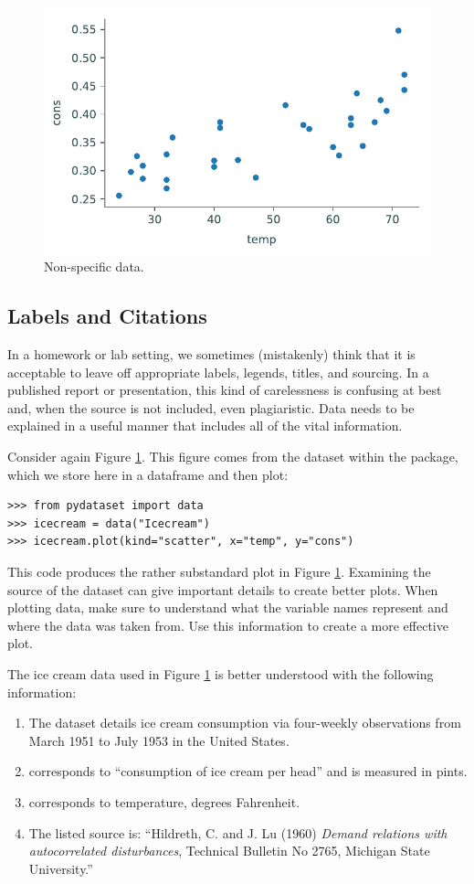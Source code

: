 \begin{figure}[H]
    \centering
    \includegraphics[width=.7\textwidth]{figures/ice_cream_bad.pdf}
    \caption{Non-specific data.}
    \label{fig:nolabels}
\end{figure}

\subsection*{Labels and Citations} %

In a homework or lab setting, we sometimes (mistakenly) think that it is acceptable to leave off appropriate labels, legends, titles, and sourcing.
In a published report or presentation, this kind of carelessness is confusing at best and, when the source is not included, even plagiaristic.
Data needs to be explained in a useful manner that includes all of the vital information.

Consider again Figure \ref{fig:nolabels}.
This figure comes from the  dataset within the  package, which we store here in a dataframe and then plot:
\begin{lstlisting}
>>> from pydataset import data
>>> icecream = data("Icecream")
>>> icecream.plot(kind="scatter", x="temp", y="cons")
\end{lstlisting}

This code produces the rather substandard plot in Figure \ref{fig:nolabels}.
Examining the source of the dataset can give important details to create better plots.
When plotting data, make sure to understand what the variable names represent and where the data was taken from.
Use this information to create a more effective plot.

The ice cream data used in Figure \ref{fig:nolabels} is better understood with the following information:
\begin{enumerate}
    \item The dataset details ice cream consumption via four-weekly observations from March 1951 to July 1953 in the United States.
    \item {} corresponds to ``consumption of ice cream per head'' and is measured in pints.
    \item {} corresponds to temperature, degrees Fahrenheit.
    \item The listed source is: ``Hildreth, C. and J. Lu (1960) \emph{Demand relations with autocorrelated disturbances}, Technical Bulletin No 2765, Michigan State University.''
\end{enumerate}

